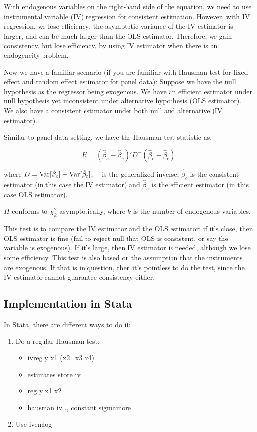 With endogenous variables on the right-hand side of the equation, we
need to use instrumental variable (IV) regression for consistent
estimation.  However, with IV regression, we lose efficiency: the
asymptotic variance of the IV estimator is larger, and can be much
larger than the OLS estimator.  Therefore, we gain consistency, but
lose efficiency, by using IV estimator when there is an endogeneity
problem.  

Now we have a familiar scenario (if you are familiar with Hausman
test for fixed effect and random effect estimator for panel data):
Suppose we have the null hypothesis as the regressor being exogenous.
We have an efficient estimator under null hypothesis yet inconsistent
under alternative hypothesis (OLS estimator). We also have a
consistent estimator under both null and alternative (IV estimator).

Similar to panel data setting, we have the Hausman test statistic as:

\[ H = (\hat \beta_c - \hat \beta_e)' D^{-} (\hat \beta_c - \hat
\beta_e) \]

where $D={\rm Var} [\hat \beta_c] - {\rm Var} [\hat \beta_e]$, $^-$ is
the generalized inverse, $\hat \beta_c$ is the consistent estimator (in
this case the IV estimator) and $\hat \beta_e$ is the efficient
estimator (in this case OLS estimator).

$H$ conforms to $\chi^2_k$ asymptotically, where $k$ is the number of endogenous
variables.

This test is to compare the IV estimator and the OLS estimator: if
it's close, then OLS estimator is fine (fail to reject null that OLS
is consistent, or say the variable is exogenous).  If it's large, then
IV estimator is needed, although we lose some efficiency.  This test
is also based on the assumption that the instruments are exogenous.
If that is in question, then it's pointless to do the test, since the
IV estimator cannot guarantee consistency either.



\subsection{Implementation in Stata}

In Stata, there are different ways to do it:

\begin{enumerate}

\item Do a regular Hausman test:
\begin{itemize}
\item ivreg y x1 (x2=x3 x4)
\item estimates store iv
\item reg y x1 x2
\item hausman iv ., constant sigmamore
\end{itemize}

\item Use ivendog

\end{enumerate}

